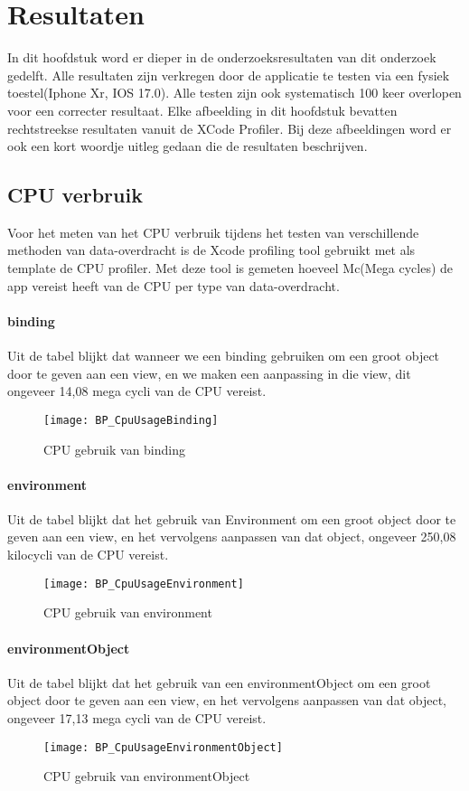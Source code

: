 \chapter{Resultaten}%
In dit hoofdstuk word er dieper in de onderzoeksresultaten van dit onderzoek gedelft. Alle resultaten zijn verkregen door de applicatie te testen via een fysiek toestel(Iphone Xr, IOS 17.0). Alle testen zijn ook systematisch 100 keer overlopen voor een correcter resultaat. Elke afbeelding in dit hoofdstuk bevatten rechtstreekse resultaten vanuit de XCode Profiler. Bij deze afbeeldingen word er ook een kort woordje uitleg gedaan die de resultaten beschrijven.

\label{ch:resultaten}
\section{CPU verbruik}
Voor het meten van het CPU verbruik tijdens het testen van verschillende methoden van data-overdracht is de Xcode profiling tool gebruikt met als template de CPU profiler. Met deze tool is gemeten hoeveel Mc(Mega cycles) de app vereist heeft van de CPU per type van data-overdracht. 

\subsubsection{binding}
Uit de tabel blijkt dat wanneer we een binding gebruiken om een groot object door te geven aan een view, en we maken een aanpassing in die view, dit ongeveer 14,08 mega cycli van de CPU vereist.
\begin{figure}[htbp]
    \centering
    \texttt{[image: BP\_CpuUsageBinding]} 
    \caption{CPU gebruik van binding}
    \label{fig:cpuBinding}
\end{figure}

\subsubsection{environment}
Uit de tabel blijkt dat het gebruik van Environment om een groot object door te geven aan een view, en het vervolgens aanpassen van dat object, ongeveer 250,08 kilocycli van de CPU vereist.
\begin{figure}[htbp]
    \centering
    \texttt{[image: BP\_CpuUsageEnvironment]} 
    \caption{CPU gebruik van environment}
    \label{fig:cpuEnvironment}
\end{figure}

\subsubsection{environmentObject}
Uit de tabel blijkt dat het gebruik van een environmentObject om een groot object door te geven aan een view, en het vervolgens aanpassen van dat object, ongeveer 17,13 mega cycli van de CPU vereist.
\begin{figure}[htbp]
    \centering
    \texttt{[image: BP\_CpuUsageEnvironmentObject]} 
    \caption{CPU gebruik van environmentObject}
    \label{fig:cpuEnvironmentObject}
\end{figure}

